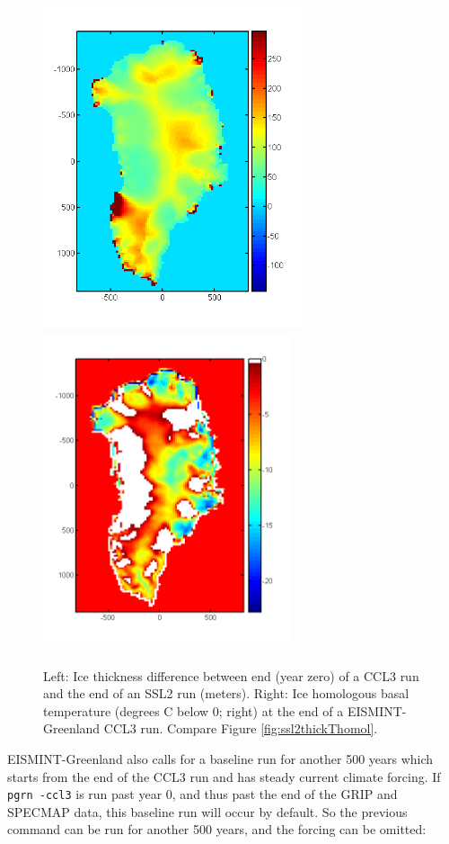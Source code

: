 \documentclass[11pt,final]{amsart}
\begin{document}
\begin{figure}[ht]
\includegraphics[height=3.7in,keepaspectratio=true]{figs/Hdiff_CCLSSL}\qquad\includegraphics[height=3.7in,width=2.9in]{figs/Thomol_CCL}
\caption{Left:  Ice thickness difference between end (year zero) of a CCL3 run and the end of an SSL2 run (meters).  Right:  Ice homologous basal temperature (degrees C below 0; right) at the end of a EISMINT-Greenland CCL3 run.  Compare Figure \ref{fig:ssl2thickThomol}.}
\label{fig:cclthickThomol}
\end{figure}

EISMINT-Greenland also calls for a baseline run for another 500 years which starts from the end of the CCL3 run and has steady current climate forcing.  If \verb|pgrn -ccl3| is run past year 0, and thus past the end of the GRIP and SPECMAP data, this baseline run will occur by default.  So the previous command can be run for another 500 years, and the forcing can be omitted:
\end{document}
